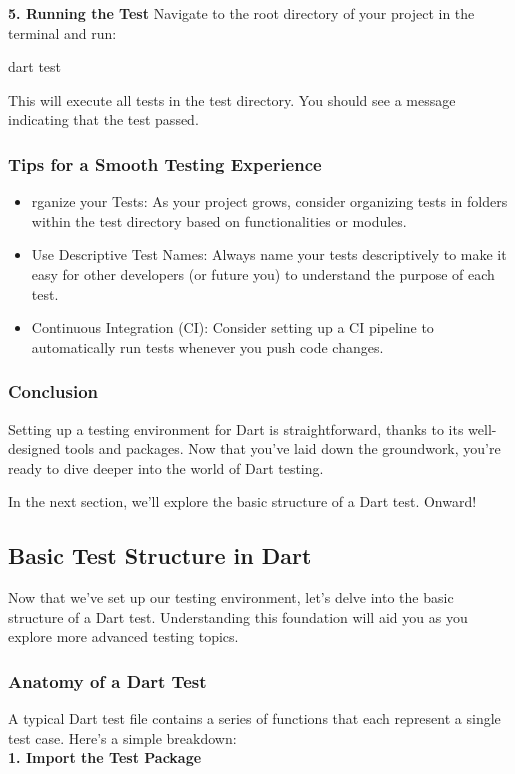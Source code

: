 \noindent\large{\textbf{5. Running the Test}}
Navigate to the root directory of your project in the terminal and run:

\begin{bashcode}
    dart test
\end{bashcode}
This will execute all tests in the test directory. You should see a message indicating that the test passed.

\subsubsection*{Tips for a Smooth Testing Experience}
\begin{itemize}
    \item rganize your Tests: As your project grows, consider organizing tests in folders within the test directory based on functionalities or modules.
    \item Use Descriptive Test Names: Always name your tests descriptively to make it easy for other developers (or future you) to understand the purpose of each test.
    \item Continuous Integration (CI): Consider setting up a CI pipeline to automatically run tests whenever you push code changes.
\end{itemize}

\subsubsection*{Conclusion}
Setting up a testing environment for Dart is straightforward, thanks to its well-designed tools and packages.
Now that you've laid down the groundwork, you're ready to dive deeper into the world of Dart testing.

In the next section, we'll explore the basic structure of a Dart test. Onward!

\subsection{Basic Test Structure in Dart}
Now that we've set up our testing environment, let's delve into the basic structure of a Dart test.
Understanding this foundation will aid you as you explore more advanced testing topics.

\subsubsection*{Anatomy of a Dart Test}
A typical Dart test file contains a series of  functions that each represent a single test case. Here's a simple breakdown:\\[1em]
\noindent\large{\textbf{1. Import the Test Package}}\\

